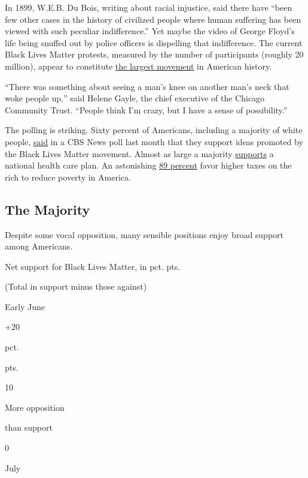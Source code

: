 In 1899, W.E.B. Du Bois, writing about racial injustice, said there have
``been few other cases in the history of civilized people where human
suffering has been viewed with such peculiar indifference.'' Yet maybe
the video of George Floyd's life being snuffed out by police officers is
dispelling that indifference. The current Black Lives Matter protests,
measured by the number of participants (roughly 20 million), appear to
constitute
\href{https://www.nytimes3xbfgragh.onion/interactive/2020/07/03/us/george-floyd-protests-crowd-size.html}{the
largest movement} in American history.

``There was something about seeing a man's knee on another man's neck
that woke people up,'' said Helene Gayle, the chief executive of the
Chicago Community Trust. ``People think I'm crazy, but I have a sense of
possibility.''

The polling is striking. Sixty percent of Americans, including a
majority of white people,
\href{https://www.cbsnews.com/news/black-lives-matter-police-reform-opinion-poll-28-06-2020/}{said}
in a CBS News poll last month that they support ideas promoted by the
Black Lives Matter movement. Almost as large a majority
\href{https://www.kff.org/slideshow/public-opinion-on-single-payer-national-health-plans-and-expanding-access-to-medicare-coverage/}{supports}
a national health care plan. An astonishing
\href{https://www.politico.com/f/?id=00000169-2b4f-d6dd-ad79-3fef4cf70002}{89
percent} favor higher taxes on the rich to reduce poverty in America.

\hypertarget{the-majority}{%
\subsection{The Majority}\label{the-majority}}

Despite some vocal opposition, many sensible positions enjoy broad
support among Americans.

Net support for Black Lives Matter, in pct. pts.

(Total in support minus those against)

Early June

+20

pct.

pts.

10

More opposition

than support

0

July

